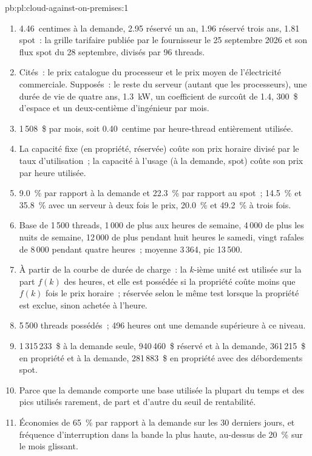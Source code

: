 \begin{solution}{pb:pl:cloud-against-on-premises:1}
\begin{enumerate}
\item 4.46~centimes à la demande, 2.95 réservé un an, 1.96 réservé trois ans, 1.81 spot~: la grille tarifaire publiée par le fournisseur le 25 septembre
2026 et son flux spot du 28 septembre, divisés par 96 threads.
\item Cités~: le prix catalogue du processeur et le prix moyen de l'électricité commerciale. Supposés~: le reste du serveur (autant que les processeurs),
une durée de vie de quatre ans, 1.3~kW, un coefficient de surcoût de 1.4, 300~\$ d'espace et un deux-centième d'ingénieur par mois.
\item 1\,508~\$ par mois, soit 0.40~centime par heure-thread entièrement utilisée.
\item La capacité fixe (en propriété, réservée) coûte son prix horaire divisé par le taux d'utilisation~; la capacité à l'usage (à la demande, spot) coûte son prix par
heure utilisée.
\item 9.0~\% par rapport à la demande et 22.3~\% par rapport au spot~; 14.5~\% et 35.8~\% avec un serveur à deux fois le prix, 20.0~\% et 49.2~\% à trois fois.
\item Base de 1\,500 threads, 1\,000 de plus aux heures de semaine, 4\,000 de plus les nuits de semaine, 12\,000 de plus pendant huit heures le samedi, vingt rafales
de 8\,000 pendant quatre heures~; moyenne 3\,364, pic 13\,500.
\item À partir de la courbe de durée de charge~: la $k$-ième unité est utilisée sur la part $f(k)$ des heures, et elle est possédée si la propriété coûte moins que $f(k)$ fois
le prix horaire~; réservée selon le même test lorsque la propriété est exclue, sinon achetée à l'heure.
\item 5\,500 threads possédés~; 496 heures ont une demande supérieure à ce niveau.
\item 1\,315\,233~\$ à la demande seule, 940\,460~\$ réservé et à la demande, 361\,215~\$ en propriété et à la demande, 281\,883~\$ en propriété avec des débordements spot.
\item Parce que la demande comporte une base utilisée la plupart du temps et des pics utilisés rarement, de part et d'autre du seuil de rentabilité.
\item Économies de 65~\% par rapport à la demande sur les 30 derniers jours, et fréquence d'interruption dans la bande la plus haute, au-dessus de 20~\% sur le mois
glissant.

\end{enumerate}
\end{solution}
